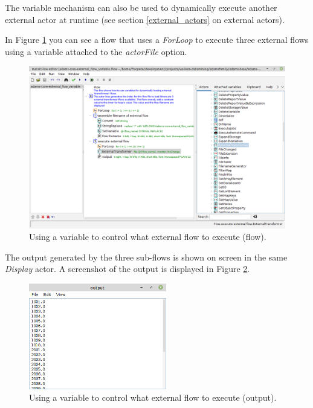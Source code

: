 The variable mechanism can also be used to dynamically execute another external
actor at runtime (see section \ref{external_actors} on external actors).

In Figure \ref{floweditor-variables2_flow} you can see a flow that uses a
\textit{ForLoop} to execute three external flows using a variable attached to
the \textit{actorFile} option.
\begin{figure}[htb]
  \centering
  \includegraphics[width=12.0cm]{images/floweditor-variables2_flow.png}
  \caption{Using a variable to control what external flow to execute (flow).}
  \label{floweditor-variables2_flow}
\end{figure}

The output generated by the three sub-flows is shown on screen in the same
\textit{Display} actor. A screenshot of the output is displayed in Figure
\ref{floweditor-variables2_output}.
\begin{figure}[htb]
  \centering
  \includegraphics[width=6.0cm]{images/floweditor-variables2_output.png}
  \caption{Using a variable to control what external flow to execute (output).}
  \label{floweditor-variables2_output}
\end{figure}

